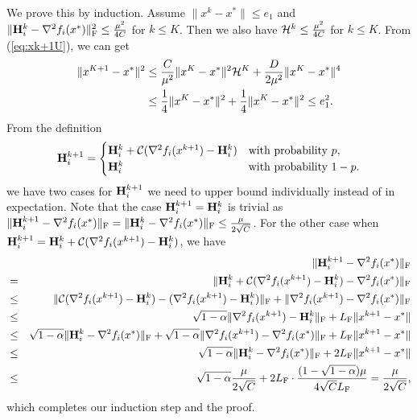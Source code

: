 \documentclass[11pt]{article}
\begin{document}
	We prove this by induction. Assume $\|x^k-x^*\| \le e_1$ and $\|\mathbf{H}_i^k - \nabla^2 f_i(x^*)\|^2_{\rm F}  \leq \frac{\mu^2}{4C}$ for $k\leq K$. Then we also have ${\cal H}^k \leq \frac{\mu^2}{4C}$ for $k\leq K$. From (\ref{eq:xk+1U}), we can get 
	\begin{align*}
		\|x^{K+1} - x^*\|^2 & \leq \frac{C}{\mu^2} \|x^K-x^*\|^2 {\cal H}^K + \frac{D}{2\mu^2} \|x^K-x^*\|^4 \\ 
		& \leq \frac{1}{4}\|x^K-x^*\|^2 + \frac{1}{4} \|x^K-x^*\|^2 \le e_1^2.
	\end{align*}
	From the definition
	\begin{equation}
		\mathbf{H}_i^{k+1} =
		\begin{cases}
			\mathbf{H}_i^k + {\mathcal{C}}(\nabla^2 f_i(x^{k+1}) - \mathbf{H}_i^k) & \text{with probability } p, \\
			\mathbf{H}_i^k & \text{with probability } 1-p.
		\end{cases}
	\end{equation}
	we have two cases for $\mathbf{H}_i^{k+1}$ we need to upper bound individually instead of in expectation. Note that the case $\mathbf{H}_i^{k+1} = \mathbf{H}_i^{k}$ is trivial as $\|\mathbf{H}_i^{k+1} - \nabla^2 f_i(x^*)\|_{\rm F} = \|\mathbf{H}_i^{k} - \nabla^2 f_i(x^*)\|_{\rm F} \le \frac{\mu}{2\sqrt{C}}$. For the other case when $\mathbf{H}_i^{k+1} = \mathbf{H}_i^k + {\mathcal{C}}(\nabla^2 f_i(x^{k+1}) - \mathbf{H}_i^k)$, we have
	\begin{eqnarray*}
		&&\|\mathbf{H}_i^{k+1} - \nabla^2 f_i(x^*)\|_{\rm F} \\
		&=& \|\mathbf{H}_i^k + {\mathcal{C}}(\nabla^2 f_i(x^{k+1}) - \mathbf{H}_i^k) - \nabla^2 f_i(x^*)\|_{\rm F} \\
		&\le& \|{\mathcal{C}}(\nabla^2 f_i(x^{k+1}) - \mathbf{H}_i^k) - (\nabla^2 f_i(x^{k+1}) - \mathbf{H}_i^k)\|_{\rm F} + \|\nabla^2 f_i(x^{k+1}) - \nabla^2 f_i(x^*)\|_{\rm F} \\
		&\le& \sqrt{1-\alpha}\|\nabla^2 f_i(x^{k+1}) - \mathbf{H}_i^k\|_{\rm F} + L_{\rm F}\|x^{k+1} - x^*\| \\
		&\le& \sqrt{1-\alpha}\|\mathbf{H}_i^k - \nabla^2 f_i(x^*)\|_{\rm F} + \sqrt{1-\alpha}\|\nabla^2 f_i(x^{k+1}) - \nabla^2 f_i(x^*)\|_{\rm F} + L_{\rm F}\|x^{k+1} - x^*\| \\
		&\le& \sqrt{1-\alpha}\|\mathbf{H}_i^k - \nabla^2 f_i(x^*)\|_{\rm F} + 2L_{\rm F}\|x^{k+1} - x^*\| \\
		&\le& \sqrt{1-\alpha}\frac{\mu}{2\sqrt{C}} + 2L_{\rm F}\cdot\frac{(1-\sqrt{1-\alpha})\mu}{4\sqrt{C}L_{\rm F}} = \frac{\mu}{2\sqrt{C}},
	\end{eqnarray*}
	which completes our induction step and the proof.
	
\end{document}
